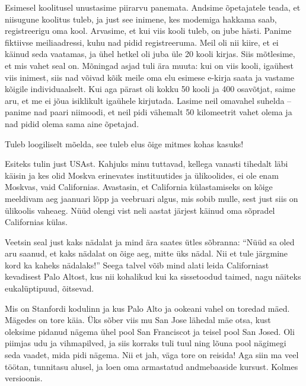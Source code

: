Esimesel koolitusel unustasime piirarvu panemata. Andsime õpetajatele teada, et niisugune koolitus
tuleb, ja just see inimene, kes modemiga hakkama saab,
registreerigu oma kool. Arvasime, et kui viis kooli tuleb, on jube
hästi. Panime fiktiivse meiliaadressi, kuhu nad pidid registreeruma. Meil oli nii kiire, et ei käinud seda vaatamas, ja ühel hetkel
oli juba üle 20 kooli kirjas. Siis mõtlesime, et
mis vahet seal on. Mõningad asjad tuli ära muuta: kui on viis
kooli, igaühest viis inimest, siis nad võivad kõik meile oma elu esimese
e-kirja saata ja vastame kõigile individuaalselt. Kui aga pärast oli kokku 50 kooli
ja 400 osavõtjat, saime aru, et me ei jõua isiklikult igaühele
kirjutada. Lasime neil omavahel suhelda -- panime nad
paari niimoodi, et neil pidi vähemalt 50 kilomeetrit vahet olema ja nad pidid olema sama aine
õpetajad.


Tuleb loogiliselt mõelda, see tuleb elus õige mitmes
kohas kasuks!


Esiteks tulin just USAst. Kahjuks minu tuttavad,
kellega vanasti tihedalt läbi käisin ja kes olid Moskva erinevates
instituutides ja ülikoolides, ei ole enam Moskvas, vaid Californias. Avastasin, et California külastamiseks on kõige meeldivam aeg
jaanuari lõpp ja veebruari algus, mis sobib mulle, sest just siis on ülikoolis
vaheaeg. Nüüd olengi vist neli aastat järjest käinud oma sõpradel Californias külas.

Veetsin seal just kaks nädalat
ja mind ära saates ütles sõbranna: \enquote{Nüüd sa oled aru saanud, et kaks
nädalat on õige aeg, mitte üks nädal. Nii et tule järgmine kord ka kaheks
nädalaks!} Seega talvel võib mind alati leida
Californiast kevadisest Palo Altost, kus nii kohalikud kui ka
sissetoodud taimed, nagu näiteks eukalüptipuud, õitsevad.


Mis on Stanfordi kodulinn ja kus Palo Alto ja ookeani vahel on toredad
mäed. Mägedes on tore käia. Üks sõber
viis mu San Jose lähedal mäe otsa, kust oleksime pidanud nägema ühel pool
San Franciscot ja teisel pool San Josed. Oli piimjas udu ja vihmapilved, ja siis korraks tuli tuul
ning lõuna pool nägimegi seda vaadet, mida pidi nägema. Nii et jah, väga tore
on reisida! Aga siin ma veel töötan, tunnitasu alusel, ja loen oma
armastatud andmebaaside kursust. Kolmes versioonis.
